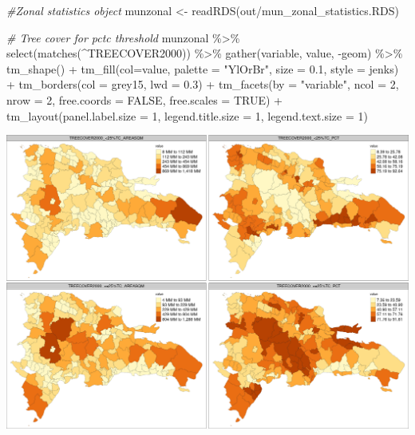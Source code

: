 \documentclass[10pt,landscape,a3paper]{article}
\newenvironment{Shaded}{\begin{snugshade}}{\end{snugshade}}
\newcommand{\AttributeTok}[1]{\textcolor[rgb]{0.77,0.63,0.00}{#1}}
\newcommand{\CommentTok}[1]{\textcolor[rgb]{0.56,0.35,0.01}{\textit{#1}}}
\newcommand{\ConstantTok}[1]{\textcolor[rgb]{0.00,0.00,0.00}{#1}}
\newcommand{\DecValTok}[1]{\textcolor[rgb]{0.00,0.00,0.81}{#1}}
\newcommand{\FloatTok}[1]{\textcolor[rgb]{0.00,0.00,0.81}{#1}}
\newcommand{\FunctionTok}[1]{\textcolor[rgb]{0.00,0.00,0.00}{#1}}
\newcommand{\NormalTok}[1]{#1}
\newcommand{\OtherTok}[1]{\textcolor[rgb]{0.56,0.35,0.01}{#1}}
\newcommand{\SpecialCharTok}[1]{\textcolor[rgb]{0.00,0.00,0.00}{#1}}
\newcommand{\StringTok}[1]{\textcolor[rgb]{0.31,0.60,0.02}{#1}}
\begin{document}
\begin{Shaded}
\begin{Highlighting}[]
\CommentTok{\#Zonal statistics object}
\NormalTok{munzonal }\OtherTok{\textless{}{-}} \FunctionTok{readRDS}\NormalTok{(}\StringTok{\textquotesingle{}out/mun\_zonal\_statistics.RDS\textquotesingle{}}\NormalTok{)}

\CommentTok{\# Tree cover for pctc threshold}
\NormalTok{munzonal }\SpecialCharTok{\%\textgreater{}\%} \FunctionTok{select}\NormalTok{(}\FunctionTok{matches}\NormalTok{(}\StringTok{\textquotesingle{}\^{}TREECOVER2000\textquotesingle{}}\NormalTok{)) }\SpecialCharTok{\%\textgreater{}\%}
  \FunctionTok{gather}\NormalTok{(variable, value, }\SpecialCharTok{{-}}\NormalTok{geom) }\SpecialCharTok{\%\textgreater{}\%}
  \FunctionTok{tm\_shape}\NormalTok{() }\SpecialCharTok{+}
  \FunctionTok{tm\_fill}\NormalTok{(}\AttributeTok{col=}\StringTok{\textquotesingle{}value\textquotesingle{}}\NormalTok{, }\AttributeTok{palette =} \StringTok{"YlOrBr"}\NormalTok{, }\AttributeTok{size =} \FloatTok{0.1}\NormalTok{, }\AttributeTok{style =} \StringTok{\textquotesingle{}jenks\textquotesingle{}}\NormalTok{) }\SpecialCharTok{+}
  \FunctionTok{tm\_borders}\NormalTok{(}\AttributeTok{col =} \StringTok{\textquotesingle{}grey15\textquotesingle{}}\NormalTok{, }\AttributeTok{lwd =} \FloatTok{0.3}\NormalTok{) }\SpecialCharTok{+}
  \FunctionTok{tm\_facets}\NormalTok{(}\AttributeTok{by =} \StringTok{"variable"}\NormalTok{, }\AttributeTok{ncol =} \DecValTok{2}\NormalTok{, }\AttributeTok{nrow =} \DecValTok{2}\NormalTok{, }\AttributeTok{free.coords =} \ConstantTok{FALSE}\NormalTok{, }\AttributeTok{free.scales =} \ConstantTok{TRUE}\NormalTok{) }\SpecialCharTok{+}
  \FunctionTok{tm\_layout}\NormalTok{(}\AttributeTok{panel.label.size =} \DecValTok{1}\NormalTok{, }\AttributeTok{legend.title.size =} \DecValTok{1}\NormalTok{, }\AttributeTok{legend.text.size =} \DecValTok{1}\NormalTok{)}
\end{Highlighting}
\end{Shaded}

\begin{center}\includegraphics{img/data-download-preparation-eda/zonal-mun-1} \end{center}
\end{document}
